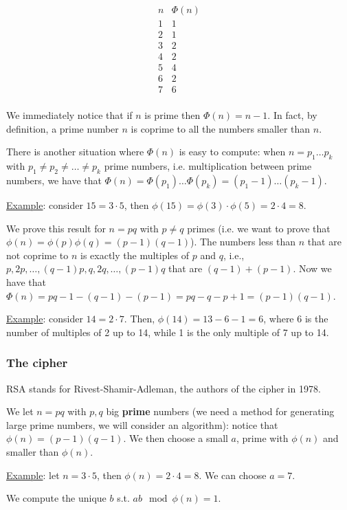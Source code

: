$$\begin{array}{c|c}n & \Phi(n) \\ \hline 1 & 1\\2 & 1\\3 & 2\\4 & 2\\ 5&4\\ 6&2 \\ 7&6 \\ \end{array}$$

We immediately notice that if $n$ is prime then $\Phi(n) = n-1$. In fact, by definition, a prime number $n$ is coprime to all the numbers smaller than $n$. 

There is another situation where $\Phi(n)$ is easy to compute: when $n=p_1 \ldots p_k$ with $p_1 \neq p_2 \neq \ldots \neq p_k$ prime numbers, i.e. multiplication between prime numbers, we have that $\Phi(n) = \Phi(p_1) \ldots \Phi(p_k) = (p_1-1) \ldots (p_k-1)$.

\underline{Example}: consider $15 = 3 \cdot 5$, then $\phi(15) = \phi(3) \cdot \phi(5) = 2 \cdot 4 = 8$. 

We prove this result for $n = pq$ with $p\neq q$ primes (i.e. we want to prove that $\phi(n) = \phi(p) \phi(q) = (p-1)(q-1)$). The numbers less than $n$ that are not coprime to $n$ is exactly the multiples of $p$ and $q$, i.e., $p,2p,\ldots,(q-1)p,q,2q,\ldots,(p-1)q$ that are $(q-1)+(p-1)$. Now we have that $\Phi(n) = pq-1 - (q-1)-(p-1) = pq -q -p +1  = (p-1)(q-1)$.

\underline{Example}: consider $14 = 2 \cdot 7$. Then, $\phi(14) = 13 - 6 - 1 = 6$, where 6 is the number of multiples of 2 up to 14, while 1 is the only multiple of 7 up to 14.

\subsubsection{The cipher}
RSA stands for Rivest-Shamir-Adleman, the authors of the cipher in 1978. 

We let $n = pq$ with $p,q$ big \textbf{prime} numbers (we need a method for generating large prime numbers, we will consider an algorithm): notice that $\phi(n) = (p-1)(q-1)$. We then choose a small $a$, prime with $\phi(n)$ and smaller than $\phi(n)$. 

\underline{Example}: let $n = 3 \cdot 5$, then $\phi(n) = 2 \cdot 4 = 8$. We can choose $a = 7$.

We compute the unique $b$ s.t. $ab \mod \phi(n) = 1$.

